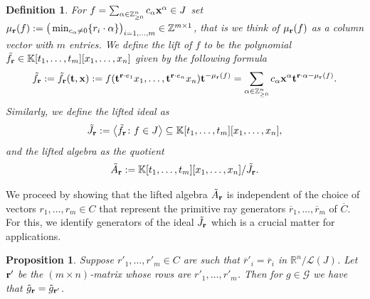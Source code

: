 \documentclass[10pt,a4paper]{amsart}
\newcommand{\thlabel}[1]{\label{#1}}
\newtheorem{Proposition}[Theorem]{Proposition}
\newtheorem{Definition}[Theorem]{Definition}
\numberwithin{equation}{section}
\begin{document}
\begin{Definition}\thlabel{def:lift}
For $f=\sum_{\alpha \in \mathbb Z^n_{\ge 0}} c_\alpha {\bf x}^{\alpha} \in J$ set ${\mu}_{\bf r}(f):=\big(\min_{c_\alpha\not =0}\{r_i\cdot \alpha\}\big)_{i=1,\dots,m}\in \mathbb Z^{m\times 1}$, that is we think of $\mu_{\bf r}(f)$ as a column vector with $m$ entries.
We define the {\it lift of $f$} to be the polynomial $ \tilde f_{\bf r} \in \mathbb K[t_1,\dots,t_m][x_1,\dots,x_n]$ given by the following formula
\begin{displaymath}
 \tilde f_{\bf r} := \tilde f_{\bf r} ({\bf t},{\bf x})
 := f({\bf t}^{{\bf r}\cdot e_1}x_1,\dots, {\bf t}^{{\bf r}\cdot e_n}x_n) {\bf t}^{-\mu_{\bf r}(f)}
 =\sum_{\alpha \in \mathbb Z^n_{\ge 0}} c_\alpha {\bf x}^{\alpha} {\bf t}^{{\bf r}\cdot \alpha -\mu_{\bf r}(f)}.
\end{displaymath}
Similarly, we define the {\it lifted ideal} as
\begin{displaymath} %
\tilde J_{\bf r}:=\big\langle \tilde f_{\bf r} \colon f \in J \big\rangle \subseteq \mathbb K[t_1,\dots,t_m][x_1,\dots,x_n],
\end{displaymath}
and the {\it lifted algebra} as the quotient
\begin{equation}\label{eq:lifted algebra}
\tilde A_{\bf r}:=\mathbb K[t_1,\dots,t_m][x_1,\dots,x_n]/\tilde J_{\bf r}.
\end{equation}
\end{Definition}
We proceed by showing that the lifted algebra $\tilde A_{\bf r}$ is independent of the choice of vectors $r_1, \dots , r_m \in C$ that represent the primitive ray generators $\overline{r}_1,\dots , \overline{r}_m$ of $\overline{C}$. For this, we identify generators of the ideal $\tilde J_{\bf r}$ which is a crucial matter for applications.

\begin{Proposition}\thlabel{prop:change rays}
Suppose $r'_1, \dots , r'_m \in C$ are such that $\overline{r}'_i= \overline{r}_i$ in $ \mathbb R^n / \mathcal{L}(J)$.
Let ${\bf r'}$ be the $(m\times n)$-matrix whose rows are $r'_1,\dots, r'_m$. Then for $g\in \mathcal{G}$ we have that $\tilde{g}_{\bf r}=\tilde{g}_{\bf r'}$.
\end{Proposition}
\end{document}
